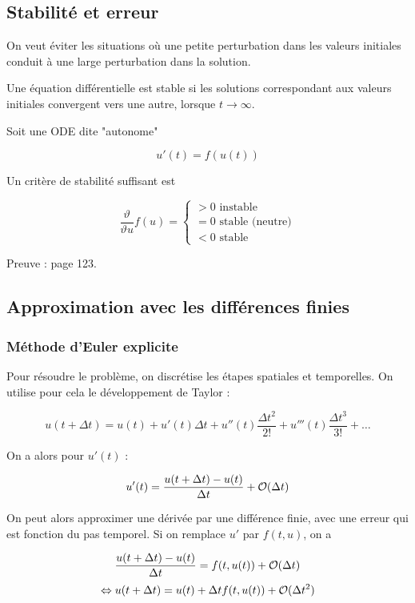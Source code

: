 	\subsection{Stabilité et erreur}
	
	On veut éviter les situations où une petite perturbation dans les valeurs initiales conduit à une large perturbation dans la solution.
	
	\begin{definition}
		Une équation différentielle est stable si les solutions correspondant aux valeurs initiales convergent vers une autre, lorsque $t \rightarrow \infty$.
	\end{definition}
	
	Soit une ODE dite "autonome"
	
	$$u'(t) = f(u(t))$$
	
	Un critère de stabilité suffisant est
	
	$$ \frac{\vartheta}{\vartheta u} f(u) = \left\{
	\begin{array}{l}
	> 0 \text{ instable} \\
	= 0 \text{ stable (neutre)} \\
	< 0 \text{ stable}
\end{array}
\right.$$
	
	Preuve : page 123.
	
	
	\subsection{Approximation avec les différences finies}
	
		\subsubsection{Méthode d'Euler explicite}
		Pour résoudre le problème, on discrétise les étapes spatiales et temporelles. On utilise pour cela le développement de Taylor :
	
		$$u(t + \Delta t) = u(t) + u'(t) \Delta t + u''(t) \frac{\Delta t^2}{2!} + u'''(t) \frac{\Delta t^3}{3!} + \dots$$
	
		On a alors pour $u'(t)$ :
	
		$$u'(t) = \frac{u(t + \Delta t) - u(t)}{\Delta t} + \mathcal{O} (\Delta t)$$
	
		On peut alors approximer une dérivée par une différence finie, avec une erreur qui est fonction du pas temporel. Si on remplace $u'$ par $f(t, u)$, on a
		
		$$\frac{u(t + \Delta t) - u(t)}{\Delta t} = f(t, u(t)) + \mathcal{O} (\Delta t)$$
		$$\Leftrightarrow u(t + \Delta t) = u(t) + \Delta t f(t, u(t)) + \mathcal{O} (\Delta t^2 )$$
		
